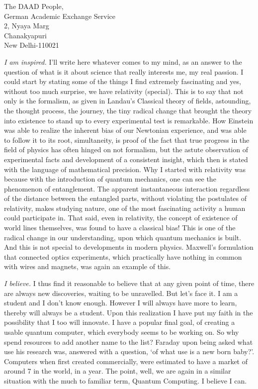 \documentclass{letter}
\begin{document}
\begin{letter}{The DAAD People,\\German Academic Exchange Service\\2, Nyaya Marg\\Chanakyapuri\\New Delhi-110021}
\begin{enumerate}
\emph{I am inspired.} I'll write here whatever comes to my mind, as an answer to the question of what is it about science that really interests me, my real passion. I could start by stating some of the things I find extremely fascinating and yes, without too much surprise, we have relativity (special). This is to say that not only is the formalism, as given in Landau's Classical theory of fields, astounding, the thought process, the journey, the tiny radical change that brought the theory into existence to stand up to every experimental test is remarkable. How Einstein was able to realize the inherent bias of our Newtonian experience, and was able to follow it to its root, simultaneity, is proof of the fact that true progress in the field of physics has often hinged on not formalism, but the astute observation of experimental facts and development of a consistent insight, which then is stated with the language of mathematical precision. Why I started with relativity was because with the introduction of quantum mechanics, one can see the phenomenon of entanglement. The apparent instantaneous interaction regardless of the distance between the entangled parts, without violating the postulates of relativity, makes studying nature, one of the most fascinating activity a human could participate in. That said, even in relativity, the concept of existence of world lines themselves, was found to have a classical bias! This is one of the radical change in our understanding, upon which quantum mechanics is built. And this is not special to developments in modern physics. Maxwell's formulation that connected optics experiments, which practically have nothing in common with wires and magnets, was again an example of this.

\emph{I believe.} I thus find it reasonable to believe that at any given point of time, there are always new discoveries, waiting to be unravelled. But let's face it. I am a student and I don't know enough. However I will always have more to learn, thereby will always be a student. Upon this realization I have put my faith in the possibility that I too will innovate. I have a popular final goal, of creating a usable quantum computer, which everybody seems to be working on. So why spend resources to add another name to the list? Faraday upon being asked what use his research was, answered with a question, `of what use is a new born baby?'. Computers when first created commercially, were estimated to have a market of around 7 in the world, in a year. The point, well, we are again in a similar situation with the much to familiar term, Quantum Computing. I believe I can.


\end{enumerate}
\end{letter}
\end{document}
